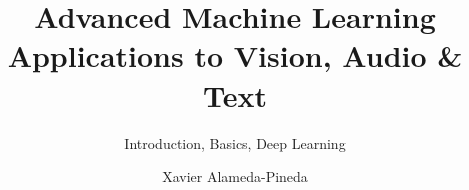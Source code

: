 \documentclass[aspectratio=169]{beamer}
\title[ALM]{Advanced Machine Learning\\ Applications to Vision, Audio \& Text}
\subtitle{Introduction, Basics, Deep Learning} %
\author[Xavi]{Xavier Alameda-Pineda}
\institute{MSIAM/MoSIG -- 2024-2025}
\date{}
\begin{document}
\begin{frame}
  \titlepage
\end{frame}



% 
% 
\end{document}
